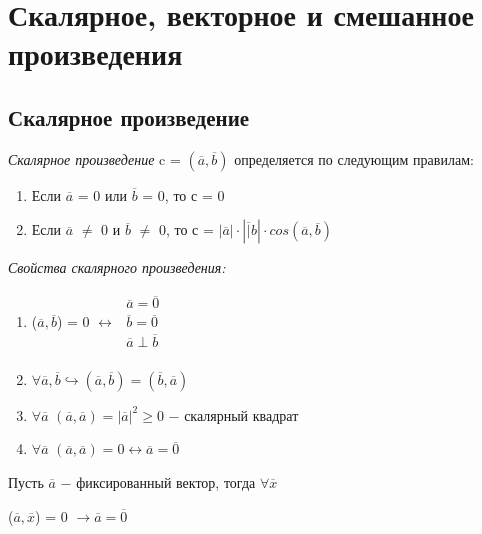 \section{Скалярное, векторное и смешанное произведения}

\subsection{Скалярное произведение}

\begin{definition}
    \textit{Скалярное произведение} c = $(\overline{a}, \overline{b})$ определяется по следующим правилам:

    \begin{enumerate}
        \item Если $\overline{a}$ = 0 или $\overline{b}$ = 0, то с = 0
        \item Если $\overline{a}$ $\neq$ 0 и $\overline{b}$ $\neq$ 0, то с = $|\overline{a}|\cdot|\overline|b|\cdot cos(\overline{a}, \overline{b})$
    \end{enumerate}
\end{definition}

\textit{Свойства скалярного произведения:}

\begin{enumerate}
    \item ($\overline{a}, \overline{b}$) = 0 $\longleftrightarrow$
    $\begin{gathered}
        \overline{a} = \overline{0}\\
        \overline{b} = \overline{0}\\
        \overline{a} \perp \overline{b}\\
    \end{gathered}$
    \item $\forall\overline{a}, \overline{b}\hookrightarrow(\overline{a}, \overline{b}) = (\overline{b}, \overline{a})$
    \item $\forall\overline{a}$    $(\overline{a}, \overline{a}) = |\overline{a}|^2\geq0$ $-$ скалярный квадрат
    \item $\forall\overline{a}$    $(\overline{a}, \overline{a}) = 0 \longleftrightarrow \overline{a} = \overline{0}$
\end{enumerate}

\begin{lemma}
    Пусть $\overline{a}$ $-$ фиксированный вектор, тогда $\forall\overline{x}$
    \begin{center}
        ($\overline{a}, \overline{x}$) = 0 $\longrightarrow \overline{a} = \overline{0}$
    \end{center}
\end{lemma}

